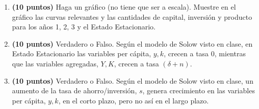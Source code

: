 \documentclass[11pt]{article}
\begin{document}
\begin{enumerate}[leftmargin=*, itemsep=10pt]
\item \textbf{(10 puntos)} Haga un gráfico (no tiene que ser a escala). Muestre en el gráfico las curvas relevantes y las cantidades de capital, inversión y producto para los años 1, 2, 3 y el Estado Estacionario.

\item \textbf{(10 puntos)} Verdadero o Falso. Según el modelo de Solow visto en clase, en Estado Estacionario las variables per cápita, $y, k$, crecen a tasa 0, mientras que las variables agregadas, $Y, K$, crecen a tasa $(\delta + n)$.

\item \textbf{(10 puntos)} Verdadero o Falso. Según el modelo de Solow visto en clase, un aumento de la tasa de ahorro/inversión, $s$, genera crecimiento en las variables per cápita, $y, k$, en el corto plazo, pero no así en el largo plazo.

\end{enumerate}
\end{document}

